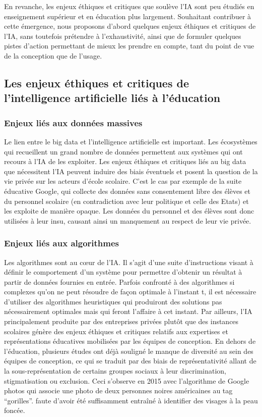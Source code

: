 En revanche, les enjeux éthiques et critiques que soulève l’IA sont peu étudiés en enseignement supérieur et en éducation plus largement. Souhaitant contribuer à cette émergence, nous proposons d’abord quelques enjeux éthiques et critiques de l’IA, sans toutefois prétendre à l’exhaustivité, ainsi que de formuler quelques pistes d’action permettant de mieux les prendre en compte, tant du point de vue de la conception que de l’usage. 

\subsection{Les enjeux éthiques et critiques de l’intelligence artificielle liés à l’éducation}

\subsubsection{Enjeux liés aux données massives}

	Le lien entre le big data et l’intelligence artificielle est important. Les écosystèmes qui recueillent un grand nombre de données permettent aux systèmes qui ont recours à l’IA de les exploiter. Les enjeux éthiques et critiques liés au big data que nécessitent l’IA peuvent induire des biais éventuels et posent la question de la vie privée sur les acteurs d’école scolaire. C’est le cas par exemple de la suite éducative Google, qui collecte des données sans consentement libre des élèves et du personnel scolaire (en contradiction avec leur politique et celle des Etats) et les exploite de manière opaque. Les données du personnel et des élèves sont donc utilisées à leur insu, causant ainsi un manquement au respect de leur vie privée. 
	
	\subsubsection{Enjeux liés aux algorithmes}
	Les algorithmes sont au cœur de l’IA. Il s’agit d’une suite d'instructions visant à définir le comportement d’un système pour permettre d’obtenir un résultat à partir de données fournies en entrée. Parfois confronté à des algorithmes si complexes qu’on ne peut résoudre de façon optimale à l'instant t, il est nécessaire d’utiliser des algorithmes heuristiques qui produiront des solutions pas nécessairement optimales mais qui feront l’affaire à cet instant. Par ailleurs, l’IA principalement produite par des entreprises privées plutôt que des instances scolaires génère des enjeux éthiques  et critiques relatifs aux expertises et représentations éducatives mobilisées par les équipes de conception. En dehors de l’éducation, plusieurs études ont déjà souligné le manque de diversité au sein des équipes de conception, ce qui se traduit par des biais de représentativité allant de la sous-représentation de certains groupes sociaux à leur discrimination, stigmatisation ou exclusion. Ceci s’observe en 2015 avec l’algorithme de Google photos qui associe une photo de deux personnes noires américaines au tag “gorilles”. faute d’avoir été suffisamment entraîné à identifier des visages à la peau foncée. 


